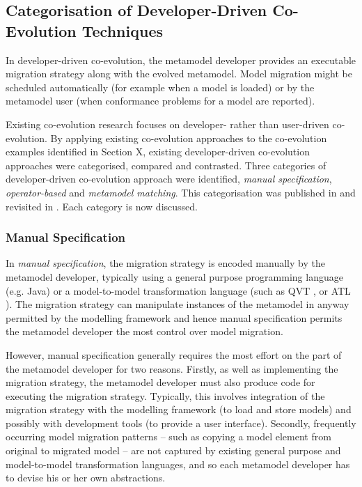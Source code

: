 \subsection{Categorisation of Developer-Driven Co-Evolution Techniques}
\label{subsec:co-evolution_categorisation}
In developer-driven co-evolution, the metamodel developer provides an executable migration strategy along with the evolved metamodel. Model migration might be scheduled automatically (for example when a model is loaded) or by the metamodel user (when conformance problems for a model are reported).

Existing co-evolution research focuses on developer- rather than user-driven co-evolution. By applying existing co-evolution approaches to the co-evolution examples identified in Section X, existing developer-driven co-evolution approaches were categorised, compared and contrasted. Three categories of developer-driven co-evolution approach were identified, \emph{manual specification}, \emph{operator-based} and \emph{metamodel matching}. This categorisation was published in \cite{rose09analysis} and revisited in \cite{rose09flock}. Each category is now discussed.


\subsubsection{Manual Specification}
In \emph{manual specification}, the migration strategy is encoded manually by the metamodel developer, typically using a general purpose programming language (e.g. Java) or a model-to-model transformation language (such as QVT \cite{qvt}, or ATL \cite{jouault05transforming}). The migration strategy can manipulate instances of the metamodel in anyway permitted by the modelling framework and hence manual specification permits the metamodel developer the most control over model migration.

However, manual specification generally requires the most effort on the part of the metamodel developer for two reasons. Firstly, as well as implementing the migration strategy, the metamodel developer must also produce code for executing the migration strategy. Typically, this involves integration of the migration strategy with the modelling framework (to load and store models) and possibly with development tools (to provide a user interface). Secondly, frequently occurring model migration patterns -- such as copying a model element from original to migrated model -- are not captured by existing general purpose and model-to-model transformation languages, and so each metamodel developer has to devise his or her own abstractions.

